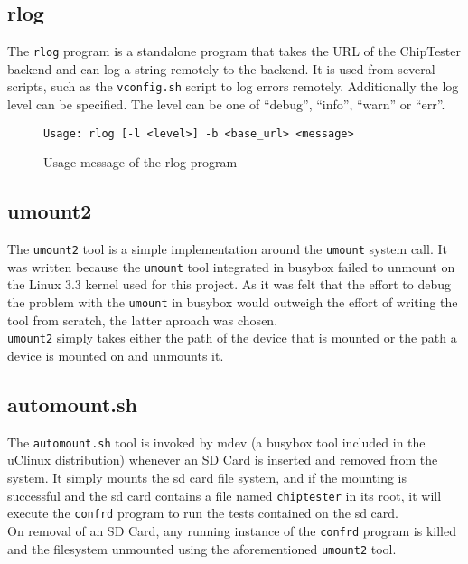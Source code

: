 \subsection{rlog}
The \texttt{rlog} program is a standalone program that takes the URL of the ChipTester
backend and can log a string remotely to the backend. It is used from several scripts, such
as the \texttt{vconfig.sh} script to log errors remotely. Additionally the log level can be
specified. The level can be one of ``debug'', ``info'', ``warn'' or ``err''.
\begin{figure}[h!]
 \lstset{basicstyle=\scriptsize\ttfamily}
\begin{lstlisting}
Usage: rlog [-l <level>] -b <base_url> <message>
\end{lstlisting}
\caption{Usage message of the rlog program}
\end{figure}


\subsection{umount2}
The \texttt{umount2} tool is a simple implementation around the \texttt{umount} system call.
It was written because the \texttt{umount} tool integrated in busybox failed to unmount
on the Linux 3.3 kernel used for this project. As it was felt that the effort to debug
the problem with the \texttt{umount} in busybox would outweigh the effort of writing the tool
from scratch, the latter aproach was chosen.
\\

\texttt{umount2} simply takes either the path of the device that is mounted or the path
a device is mounted on and unmounts it.


\subsection{automount.sh}
The \texttt{automount.sh} tool is invoked by mdev (a busybox tool included in the uClinux
distribution) whenever an SD Card is inserted and removed
from the system. It simply mounts the sd card file system, and if the mounting is
successful and the sd card contains a file named \texttt{chiptester} in its root, it
will execute the \texttt{confrd} program to run the tests contained on the sd card.
\\

On removal of an SD Card, any running instance of the \texttt{confrd} program is killed
and the filesystem unmounted using the aforementioned \texttt{umount2} tool.


